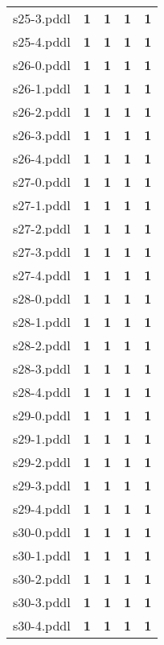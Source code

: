 \documentclass{article}
\begin{document}
\begin{tabular}{@{}lrrrr@{}}
s25-3.pddl & \textbf{1} & \textbf{1} & \textbf{1} & \textbf{1} \\
s25-4.pddl & \textbf{1} & \textbf{1} & \textbf{1} & \textbf{1} \\
s26-0.pddl & \textbf{1} & \textbf{1} & \textbf{1} & \textbf{1} \\
s26-1.pddl & \textbf{1} & \textbf{1} & \textbf{1} & \textbf{1} \\
s26-2.pddl & \textbf{1} & \textbf{1} & \textbf{1} & \textbf{1} \\
s26-3.pddl & \textbf{1} & \textbf{1} & \textbf{1} & \textbf{1} \\
s26-4.pddl & \textbf{1} & \textbf{1} & \textbf{1} & \textbf{1} \\
s27-0.pddl & \textbf{1} & \textbf{1} & \textbf{1} & \textbf{1} \\
s27-1.pddl & \textbf{1} & \textbf{1} & \textbf{1} & \textbf{1} \\
s27-2.pddl & \textbf{1} & \textbf{1} & \textbf{1} & \textbf{1} \\
s27-3.pddl & \textbf{1} & \textbf{1} & \textbf{1} & \textbf{1} \\
s27-4.pddl & \textbf{1} & \textbf{1} & \textbf{1} & \textbf{1} \\
s28-0.pddl & \textbf{1} & \textbf{1} & \textbf{1} & \textbf{1} \\
s28-1.pddl & \textbf{1} & \textbf{1} & \textbf{1} & \textbf{1} \\
s28-2.pddl & \textbf{1} & \textbf{1} & \textbf{1} & \textbf{1} \\
s28-3.pddl & \textbf{1} & \textbf{1} & \textbf{1} & \textbf{1} \\
s28-4.pddl & \textbf{1} & \textbf{1} & \textbf{1} & \textbf{1} \\
s29-0.pddl & \textbf{1} & \textbf{1} & \textbf{1} & \textbf{1} \\
s29-1.pddl & \textbf{1} & \textbf{1} & \textbf{1} & \textbf{1} \\
s29-2.pddl & \textbf{1} & \textbf{1} & \textbf{1} & \textbf{1} \\
s29-3.pddl & \textbf{1} & \textbf{1} & \textbf{1} & \textbf{1} \\
s29-4.pddl & \textbf{1} & \textbf{1} & \textbf{1} & \textbf{1} \\
s30-0.pddl & \textbf{1} & \textbf{1} & \textbf{1} & \textbf{1} \\
s30-1.pddl & \textbf{1} & \textbf{1} & \textbf{1} & \textbf{1} \\
s30-2.pddl & \textbf{1} & \textbf{1} & \textbf{1} & \textbf{1} \\
s30-3.pddl & \textbf{1} & \textbf{1} & \textbf{1} & \textbf{1} \\
s30-4.pddl & \textbf{1} & \textbf{1} & \textbf{1} & \textbf{1} \\
\end{tabular}
\end{document}
